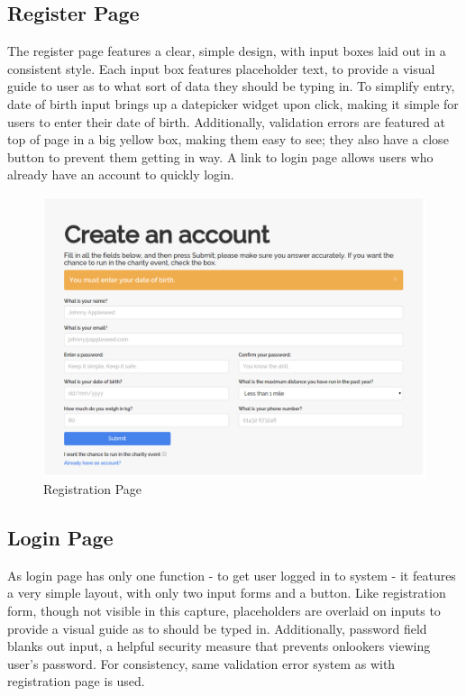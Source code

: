 \documentclass{article}[12pt,a4paper]
\begin{document}
\subsection{Register Page}
The register page features a clear, simple design, with input boxes laid out in a consistent style. Each input box features placeholder text, to provide a visual guide to user as to what sort of data they should be typing in. To simplify entry, date of birth input brings up a datepicker widget upon click, making it simple for users to enter their date of birth. Additionally, validation errors are featured at top of page in a big yellow box, making them easy to see; they also have a close button to prevent them getting in way. A link to login page allows users who already have an account to quickly login.

\begin{figure}[h!]
  \includegraphics[scale=0.35]{final_ui/register}
  \caption{Registration Page}
\end{figure}
\clearpage

\subsection{Login Page}
As login page has only one function - to get user logged in to system - it features a very simple layout, with only two input forms and a button. Like registration form, though not visible in this capture, placeholders are overlaid on inputs to provide a visual guide as to should be typed in. Additionally, password field blanks out input, a helpful security measure that prevents onlookers viewing user's password. For consistency, same validation error system as with registration page is used.
\end{document}
